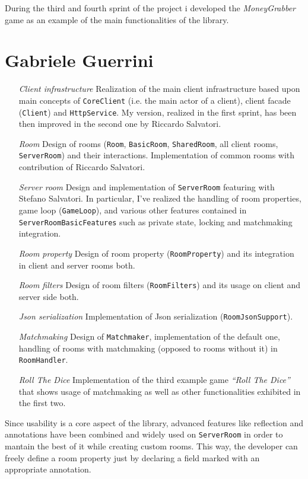 During the third and fourth sprint of the project i developed the \textit{MoneyGrabber} game as an example of the main functionalities of the library. 

\section{Gabriele Guerrini}

\begin{itemize}

\item[\em{Client infrastructure}] Realization of the main client infrastructure based upon main concepts of \texttt{CoreClient} (i.e. the main actor of a client), client facade (\texttt{Client}) and \texttt{HttpService}. My version, realized in the first sprint, has been then improved in the second one by Riccardo Salvatori.   

\item[\em{Room}] Design of rooms (\texttt{Room}, \texttt{BasicRoom}, \texttt{SharedRoom}, all client rooms, \texttt{ServerRoom}) and their interactions. Implementation of common rooms with contribution of Riccardo Salvatori.

\item[\em{Server room}] Design and implementation of \texttt{ServerRoom} featuring with Stefano Salvatori. In particular, I've realized the handling of room properties, game loop (\texttt{GameLoop}), and various other features contained in \texttt{ServerRoomBasicFeatures} such as private state, locking and matchmaking integration.

\item[\em{Room property}] Design of room property (\texttt{RoomProperty}) and its integration in client and server rooms both.

\item[\em{Room filters}] Design of room filters (\texttt{RoomFilters}) and its usage on client and server side both.

\item[\em{Json serialization}] Implementation of Json serialization (\texttt{RoomJsonSupport}).

\item[\em{Matchmaking}] Design of \texttt{Matchmaker}, implementation of the default one, handling of rooms with matchmaking (opposed to rooms without it) in \texttt{RoomHandler}.

\item[\em{Roll The Dice}] Implementation of the third example game \textit{``Roll The Dice''} that shows usage of matchmaking as well as other functionalities exhibited in the first two.

\end{itemize}

Since usability is a core aspect of the library, advanced features like reflection and annotations have been combined and widely used on \texttt{ServerRoom} in order to mantain the best of it while creating custom rooms. This way, the developer can freely define a room property just by declaring a field marked with an appropriate annotation.




